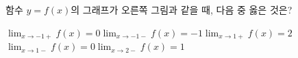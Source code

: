 \noindent\begin{minipage}[t]{0.58\linewidth}\vspace{0pt}\raggedright 함수 $y=f(x)$의 그래프가 오른쪽 그림과 같을 때, 다음 중 옳은 것은?\end{minipage}\hfill\begin{minipage}[t]{0.4\linewidth}\vspace{0pt}\centering \resizebox{\ifdim\width>\linewidth\linewidth\else\width\fi}{!}{}\end{minipage}\par
\begin{choicesv}{$\displaystyle\lim_{x\to-1+} f(x)=0$}{$\displaystyle\lim_{x\to-1-} f(x)=-1$}{$\displaystyle\lim_{x\to 1+} f(x)=2$}{$\displaystyle\lim_{x\to 1-} f(x)=0$}{$\displaystyle\lim_{x\to 2-} f(x)=1$}\end{choicesv}
